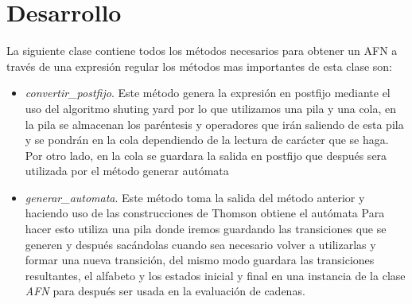 \documentclass[titlepage]{article}
\begin{document}
  \section{Desarrollo}
  La siguiente clase contiene todos los métodos necesarios para obtener un AFN a través de una expresión regular los métodos mas importantes de esta clase son:
  
  \begin{itemize}
  	\item \emph{convertir\_postfijo}. Este método genera la expresión en postfijo mediante el uso del algoritmo shuting yard \cite{postfijo} por lo que utilizamos una pila y una cola, en la pila se almacenan los paréntesis y operadores que irán saliendo de esta pila y se pondrán en la cola dependiendo de la lectura de carácter que se haga. 
  	Por otro lado, en la cola se guardara la salida en postfijo que después sera utilizada por el método generar autómata
  	\item \emph{generar\_automata}. Este método toma la salida del método anterior y haciendo uso de las construcciones de Thomson obtiene el autómata Para hacer esto utiliza una pila donde iremos guardando las transiciones que se generen y después sacándolas cuando sea necesario volver a utilizarlas y formar una nueva transición, del mismo modo guardara las transiciones resultantes, el alfabeto y los estados inicial y final en una instancia de la clase \emph{AFN} para después ser usada en la evaluación de cadenas.
  \end{itemize} 
\end{document}
